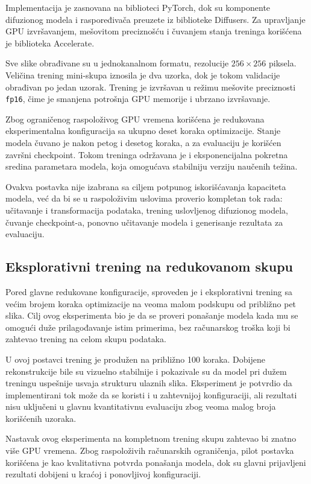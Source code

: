 \documentclass[10pt]{article}
\begin{document}
	Implementacija je zasnovana na biblioteci PyTorch, dok su komponente difuzionog modela i raspoređivača preuzete iz biblioteke Diffusers. Za upravljanje GPU izvršavanjem, mešovitom preciznošću i čuvanjem stanja treninga korišćena je biblioteka Accelerate.
	
	Sve slike obrađivane su u jednokanalnom formatu, rezolucije $256 \times 256$ piksela. Veličina trening mini-skupa iznosila je dva uzorka, dok je tokom validacije obrađivan po jedan uzorak. Trening je izvršavan u režimu mešovite preciznosti \texttt{fp16}, čime je smanjena potrošnja GPU memorije i ubrzano izvršavanje.
	
	Zbog ograničenog raspoloživog GPU vremena korišćena je redukovana eksperimentalna konfiguracija sa ukupno deset koraka optimizacije. Stanje modela čuvano je nakon petog i desetog koraka, a za evaluaciju je korišćen završni checkpoint. Tokom treninga održavana je i eksponencijalna pokretna sredina parametara modela, koja omogućava stabilniju verziju naučenih težina.
	
	Ovakva postavka nije izabrana sa ciljem potpunog iskorišćavanja kapaciteta modela, već da bi se u raspoloživim uslovima proverio kompletan tok rada: učitavanje i transformacija podataka, trening uslovljenog difuzionog modela, čuvanje checkpoint-a, ponovno učitavanje modela i generisanje rezultata za evaluaciju.
	
	\subsection{Eksplorativni trening na redukovanom skupu}
	
	Pored glavne redukovane konfiguracije, sproveden je i eksplorativni trening sa većim brojem koraka optimizacije na veoma malom podskupu od približno pet slika. Cilj ovog eksperimenta bio je da se proveri ponašanje modela kada mu se omogući duže prilagođavanje istim primerima, bez računarskog troška koji bi zahtevao trening na celom skupu podataka.
	
	U ovoj postavci trening je produžen na približno 100 koraka. Dobijene rekonstrukcije bile su vizuelno stabilnije i pokazivale su da model pri dužem treningu uspešnije usvaja strukturu ulaznih slika. Eksperiment je potvrdio da implementirani tok može da se koristi i u zahtevnijoj konfiguraciji, ali rezultati nisu uključeni u glavnu kvantitativnu evaluaciju zbog veoma malog broja korišćenih uzoraka.
	
	Nastavak ovog eksperimenta na kompletnom trening skupu zahtevao bi znatno više GPU vremena. Zbog raspoloživih računarskih ograničenja, pilot postavka korišćena je kao kvalitativna potvrda ponašanja modela, dok su glavni prijavljeni rezultati dobijeni u kraćoj i ponovljivoj konfiguraciji.
	
\end{document}
